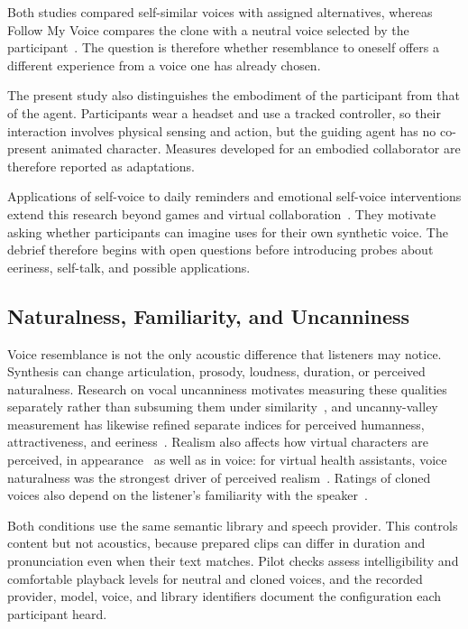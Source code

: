 Both studies compared self-similar voices with assigned alternatives, whereas Follow My Voice compares the clone with a neutral voice selected by the participant~\cite{kao2021selfsimilar,guo2024doppelganger}. The question is therefore whether resemblance to oneself offers a different experience from a voice one has already chosen.

The present study also distinguishes the embodiment of the participant from that of the agent. Participants wear a headset and use a tracked controller, so their interaction involves physical sensing and action, but the guiding agent has no co-present animated character. Measures developed for an embodied collaborator are therefore reported as adaptations.

Applications of self-voice to daily reminders and emotional self-voice interventions extend this research beyond games and virtual collaboration~\cite{kim2024selfvoice,fang2025emotional}. They motivate asking whether participants can imagine uses for their own synthetic voice. The debrief therefore begins with open questions before introducing probes about eeriness, self-talk, and possible applications.

\subsection{Naturalness, Familiarity, and Uncanniness}
Voice resemblance is not the only acoustic difference that listeners may notice. Synthesis can change articulation, prosody, loudness, duration, or perceived naturalness. Research on vocal uncanniness motivates measuring these qualities separately rather than subsuming them under similarity~\cite{diel2024uncanny}, and uncanny-valley measurement has likewise refined separate indices for perceived humanness, attractiveness, and eeriness~\cite{homacdorman2017eeriness}. Realism also affects how virtual characters are perceived, in appearance~\cite{zibrek2018appearance} as well as in voice: for virtual health assistants, voice naturalness was the strongest driver of perceived realism~\cite{maxim2025realism}. Ratings of cloned voices also depend on the listener's familiarity with the speaker~\cite{mcgettigan2025cloned}.

Both conditions use the same semantic library and speech provider. This controls content but not acoustics, because prepared clips can differ in duration and pronunciation even when their text matches. Pilot checks assess intelligibility and comfortable playback levels for neutral and cloned voices, and the recorded provider, model, voice, and library identifiers document the configuration each participant heard.

